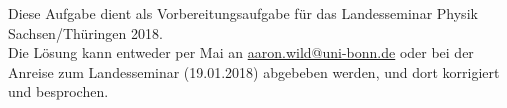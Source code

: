 \documentclass[a4paper,11pt]{article}
\begin{document}
	\vspace*{-2cm}
	\pagestyle{empty}
\begin{framed}
	\noindent
	\scriptsize
	Diese Aufgabe dient als Vorbereitungsaufgabe für das Landesseminar Physik Sachsen/Thüringen 2018.\\
	Die Lösung kann entweder per Mai an 
	 \href{mailto:aaronwild@uni-bonn.de}{aaron.wild@uni-bonn.de} oder bei der Anreise zum Landesseminar (19.01.2018) abgebeben werden, und dort korrigiert und besprochen.
\end{framed}

\noindent


\end{document}

